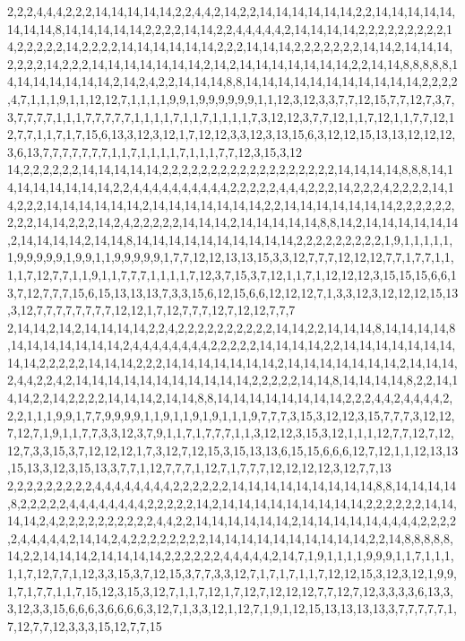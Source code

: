 2,2,2,4,4,4,2,2,2,14,14,14,14,14,2,2,4,4,2,14,2,2,14,14,14,14,14,14,2,2,14,14,14,14,14,14,14,14,8,14,14,14,14,14,2,2,2,2,14,14,2,2,4,4,4,4,4,2,14,14,14,14,2,2,2,2,2,2,2,2,2,14,2,2,2,2,2,14,2,2,2,2,14,14,14,14,14,14,2,2,2,14,14,14,2,2,2,2,2,2,2,14,14,2,14,14,14,2,2,2,2,14,2,2,2,14,14,14,14,14,14,14,2,14,2,14,14,14,14,14,14,14,2,2,14,14,8,8,8,8,8,14,14,14,14,14,14,14,2,14,2,4,2,2,14,14,14,8,8,14,14,14,14,14,14,14,14,14,14,14,2,2,2,2,4,7,1,1,1,9,1,1,12,12,7,1,1,1,1,9,9,1,9,9,9,9,9,9,1,1,12,3,12,3,3,7,7,12,15,7,7,12,7,3,7,3,7,7,7,7,1,1,1,7,7,7,7,7,1,1,1,1,7,1,1,7,1,1,1,1,7,3,12,12,3,7,7,12,1,1,7,12,1,1,7,7,12,12,7,7,1,1,7,1,7,15,6,13,3,12,3,12,1,7,12,12,3,3,12,3,13,15,6,3,12,12,15,13,13,12,12,12,3,6,13,7,7,7,7,7,7,7,1,1,7,1,1,1,1,7,1,1,1,7,7,12,3,15,3,12
14,2,2,2,2,2,2,14,14,14,14,14,2,2,2,2,2,2,2,2,2,2,2,2,2,2,2,2,2,2,14,14,14,14,8,8,8,14,14,14,14,14,14,14,14,2,2,4,4,4,4,4,4,4,4,4,4,2,2,2,2,2,4,4,4,2,2,2,14,2,2,2,4,2,2,2,2,14,14,2,2,2,14,14,14,14,14,14,2,14,14,14,14,14,14,14,2,2,14,14,14,14,14,14,14,2,2,2,2,2,2,2,2,2,14,14,2,2,2,14,2,4,2,2,2,2,2,14,14,14,2,14,14,14,14,14,8,8,14,2,14,14,14,14,14,14,2,14,14,14,14,2,14,14,8,14,14,14,14,14,14,14,14,14,14,2,2,2,2,2,2,2,2,2,1,9,1,1,1,1,1,1,9,9,9,9,9,1,9,9,1,1,9,9,9,9,9,1,7,7,12,12,13,13,15,3,3,12,7,7,7,12,12,12,7,7,1,7,7,1,1,1,1,7,12,7,7,1,1,9,1,1,7,7,7,1,1,1,1,7,12,3,7,15,3,7,12,1,1,7,1,12,12,12,3,15,15,15,6,6,13,7,12,7,7,7,15,6,15,13,13,13,7,3,3,15,6,12,15,6,6,12,12,12,7,1,3,3,12,3,12,12,12,15,13,3,12,7,7,7,7,7,7,7,7,12,12,1,7,12,7,7,7,12,7,12,12,7,7,7
2,14,14,2,14,2,14,14,14,14,2,2,4,2,2,2,2,2,2,2,2,2,2,14,14,2,2,14,14,14,8,14,14,14,14,8,14,14,14,14,14,14,14,2,4,4,4,4,4,4,4,4,2,2,2,2,2,14,14,14,14,2,2,14,14,14,14,14,14,14,14,14,2,2,2,2,2,14,14,14,2,2,2,14,14,14,14,14,14,14,2,14,14,14,14,14,14,14,2,14,14,14,2,4,4,2,2,4,2,14,14,14,14,14,14,14,14,14,14,14,2,2,2,2,2,14,14,8,14,14,14,14,8,2,2,14,14,14,2,2,14,2,2,2,2,14,14,14,2,14,14,8,8,14,14,14,14,14,14,14,14,2,2,2,4,4,2,4,4,4,4,2,2,2,1,1,1,9,9,1,7,7,9,9,9,9,1,1,9,1,1,9,1,9,1,1,1,9,7,7,7,3,15,3,12,12,3,15,7,7,7,3,12,12,7,12,7,1,9,1,1,7,7,3,3,12,3,7,9,1,1,7,1,7,7,7,1,1,3,12,12,3,15,3,12,1,1,1,12,7,7,12,7,12,12,7,3,3,15,3,7,12,12,12,1,7,3,12,7,12,15,3,15,13,13,6,15,15,6,6,6,12,7,12,1,1,12,13,13,15,13,3,12,3,15,13,3,7,7,1,12,7,7,7,1,12,7,1,7,7,7,12,12,12,12,3,12,7,7,13
2,2,2,2,2,2,2,2,2,4,4,4,4,4,4,4,4,2,2,2,2,2,2,14,14,14,14,14,14,14,14,14,8,8,14,14,14,14,8,2,2,2,2,2,4,4,4,4,4,4,4,4,2,2,2,2,2,14,2,14,14,14,14,14,14,14,14,14,2,2,2,2,2,2,14,14,14,14,2,4,2,2,2,2,2,2,2,2,2,2,4,4,2,2,14,14,14,14,14,14,2,14,14,14,14,14,4,4,4,4,2,2,2,2,2,4,4,4,4,4,2,14,14,2,4,2,2,2,2,2,2,2,2,14,14,14,14,14,14,14,14,14,14,2,2,14,8,8,8,8,8,14,2,2,14,14,14,2,14,14,14,14,2,2,2,2,2,2,4,4,4,4,4,2,14,7,1,9,1,1,1,1,9,9,9,1,1,7,1,1,1,1,1,7,12,7,7,1,12,3,3,15,3,7,12,15,3,7,7,3,3,12,7,1,7,1,7,1,1,7,12,12,15,3,12,3,12,1,9,9,1,7,1,7,7,1,1,7,15,12,3,15,3,12,7,1,1,7,12,1,7,12,7,12,12,12,7,7,12,7,12,3,3,3,3,6,13,3,3,12,3,3,15,6,6,6,3,6,6,6,6,3,12,7,1,3,3,12,1,12,7,1,9,1,12,15,13,13,13,13,3,7,7,7,7,7,1,7,12,7,7,12,3,3,3,15,12,7,7,15
